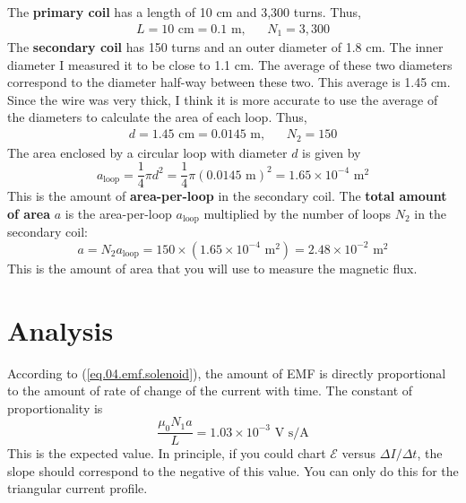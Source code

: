 The \textbf{primary coil} has a length of 10 cm and 3,300 turns. Thus,
\begin{align}
	L = 10 \text{ cm} = 0.1 \text{ m}, && N_{1} = 3,300
\end{align}
The \textbf{secondary coil} has 150 turns and an outer diameter of 1.8 cm. The inner diameter I measured it to be close to 1.1 cm. The average of these two diameters correspond to the diameter half-way between these two. This average is 1.45 cm. Since the wire was very thick, I think it is more accurate to use the average of the diameters to calculate the area of each loop. Thus,
\begin{align}
	d = 1.45 \text{ cm} = 0.0145 \text{ m}, && N_{2} = 150
\end{align}
The area enclosed by a circular loop with diameter $d$ is given by
\begin{equation}
	a_{\text{loop}} = \frac{1}{4} \pi d^{2} = \frac{1}{4} \pi (0.0145 \text{ m})^2 = 1.65 \times 10^{-4} \text{ m}^{2}
\end{equation}
This is the amount of \textbf{area-per-loop} in the secondary coil. The \textbf{total amount of area} $a$ is the area-per-loop $a_{\text{loop}}$ multiplied by the number of loops $N_{2}$ in the secondary coil:
\begin{equation}
	a = N_{2} a_{\text{loop}} = 150 \times (1.65 \times 10^{-4} \text{ m}^{2}) = 2.48 \times 10^{-2} \text{ m}^{2}
\end{equation}
This is the amount of area that you will use to measure the magnetic flux.
\section{Analysis}
According to (\ref{eq.04.emf.solenoid}), the amount of EMF is directly proportional to the amount of rate of change of the current with time. The constant of proportionality is
\begin{equation}
	\frac{\mu_{0} N_{1} a}{L} = 1.03 \times 10^{-3} \text{ V s/A}
	\label{eq.04.slope}
\end{equation}
This is the expected value. In principle, if you could chart $\mathcal{E}$ versus $\Delta I / \Delta t$, the slope should correspond to the negative of this value. You can only do this for the triangular current profile.
